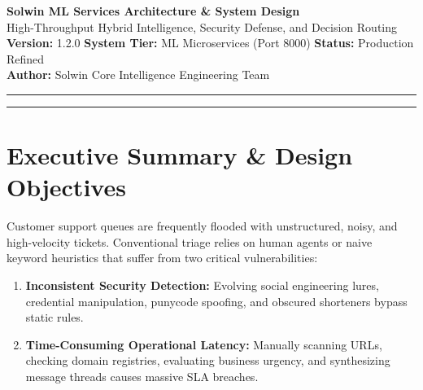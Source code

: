 \documentclass[11pt,a4paper]{article}
\begin{document}
\begin{center}
    {\LARGE \textbf{\color{primary} Solwin ML Services Architecture \& System Design}}\\[6pt]
    {\large High-Throughput Hybrid Intelligence, Security Defense, and Decision Routing}\\[4pt]
    \vspace{2pt}
    \textbf{Version:} 1.2.0 \quad \textbar \quad \textbf{System Tier:} ML Microservices (Port 8000) \quad \textbar \quad \textbf{Status:} Production Refined\\[1pt]
    \textbf{Author:} Solwin Core Intelligence Engineering Team\\[8pt]
    \rule{\linewidth}{1pt}
\end{center}

\begin{abstract}
This system design document details the architecture, component topology, failure modes, data contracts, and algorithmic foundations of the \textbf{Solwin ML Service} (\texttt{app/ml\_services}). Solwin operates as a dual-engine platform combining fast, deterministic local inference (sub-5ms CPU heuristics, TF-IDF category classification, and regex security scanners) with cloud-native generative AI models (Google Gemini 2.5 Flash). The service delivers automated complaint classification across 11 canonical business sectors, unsupervised centroid clustering, objective urgency calculation, factual resolution state tracking, URL/email security threat intelligence, zero-hallucination entity summarization, and rule-governed operational routing.
\end{abstract}

\tableofcontents
\vspace{1em}
\hrule
\vspace{1.5em}

\section{Executive Summary \& Design Objectives}
Customer support queues are frequently flooded with unstructured, noisy, and high-velocity tickets. Conventional triage relies on human agents or naive keyword heuristics that suffer from two critical vulnerabilities:
\begin{enumerate}[leftmargin=*]
    \item \textbf{Inconsistent Security Detection:} Evolving social engineering lures, credential manipulation, punycode spoofing, and obscured shorteners bypass static rules.
    \item \textbf{Time-Consuming Operational Latency:} Manually scanning URLs, checking domain registries, evaluating business urgency, and synthesizing message threads causes massive SLA breaches.
\end{enumerate}
\end{document}
